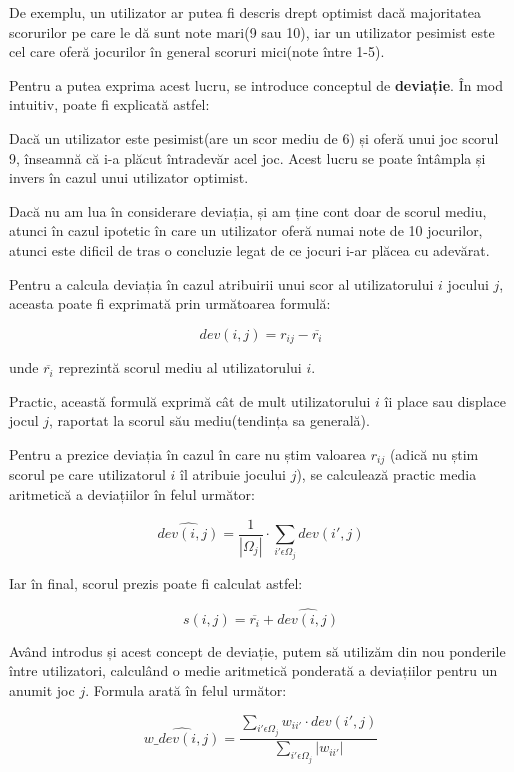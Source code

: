 \documentclass[12pt,a4paper]{report}
\begin{document}
De exemplu, un utilizator ar putea fi descris drept optimist dacă majoritatea scorurilor pe care le dă sunt note mari(9 sau 10), iar un utilizator pesimist este cel care oferă jocurilor în general scoruri mici(note între 1-5).

Pentru a putea exprima acest lucru, se introduce conceptul de \textbf{deviație}. În mod intuitiv, poate fi explicată astfel:

\bigskip

Dacă un utilizator este pesimist(are un scor mediu de 6) și oferă unui joc scorul 9, înseamnă că i-a plăcut întradevăr acel joc. Acest lucru se poate întâmpla și invers în cazul unui utilizator optimist.

Dacă nu am lua în considerare deviația, și am ține cont doar de scorul mediu, atunci în cazul ipotetic în care un utilizator oferă numai note de 10 jocurilor, atunci este dificil de tras o concluzie legat de ce jocuri i-ar plăcea cu adevărat.

\bigskip

Pentru a calcula deviația în cazul atribuirii unui scor al utilizatorului \( i \) jocului \( j \), aceasta poate fi exprimată prin următoarea formulă:

\[ dev(i,j) = r_{ij} - \overline{r_{i}} \]

unde \( \overline{r_{i}}\) reprezintă scorul mediu al utilizatorului \( i \).

Practic, această formulă exprimă cât de mult utilizatorului \( i \) îi place sau displace jocul \( j \), raportat la scorul său mediu(tendința sa generală).

Pentru a prezice deviația în cazul în care nu știm valoarea \( r_{ij}\) (adică nu știm scorul pe care utilizatorul \( i \) îl atribuie jocului \( j \)), se calculează practic media aritmetică a deviațiilor în felul următor:

\[ \hat{dev(i,j)} = \frac{1}{|\Omega_{j}|} \cdot \sum\limits_{i' \epsilon \Omega_{j} } dev(i', j) \] 

Iar în final, scorul prezis poate fi calculat astfel:

\[ s(i,j) = \overline{r_i} + \hat{dev(i,j)} \]

\bigskip

Având introdus și acest concept de deviație, putem să utilizăm din nou ponderile între utilizatori, calculând o medie aritmetică ponderată a deviațiilor pentru un anumit joc \( j \). Formula arată în felul următor:

\[ \hat{w\_dev(i,j)} = \dfrac{ \sum\limits_{i' \epsilon \Omega_{j} } w_{ii'} \cdot dev(i', j) }{\sum\limits_{i' \epsilon \Omega_{j}} |w_{ii'}|} \]
\end{document}
